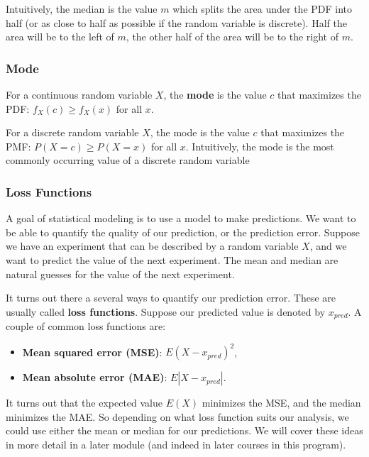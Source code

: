 \documentclass[
]{book}
\providecommand{\tightlist}{%
  \setlength{\itemsep}{0pt}\setlength{\parskip}{0pt}}
\begin{document}
Intuitively, the median is the value \(m\) which splits the area under the PDF into half (or as close to half as possible if the random variable is discrete). Half the area will be to the left of \(m\), the other half of the area will be to the right of \(m\).

\hypertarget{mode-1}{%
\subsubsection{Mode}\label{mode-1}}

For a continuous random variable \(X\), the \textbf{mode} is the value \(c\) that maximizes the PDF: \(f_X(c) \geq f_X(x)\) for all \(x\).

For a discrete random variable \(X\), the mode is the value \(c\) that maximizes the PMF: \(P(X=c) \geq P(X=x)\) for all \(x\). Intuitively, the mode is the most commonly occurring value of a discrete random variable

\hypertarget{lossfunc}{%
\subsubsection{Loss Functions}\label{lossfunc}}

A goal of statistical modeling is to use a model to make predictions. We want to be able to quantify the quality of our prediction, or the prediction error. Suppose we have an experiment that can be described by a random variable \(X\), and we want to predict the value of the next experiment. The mean and median are natural guesses for the value of the next experiment.

It turns out there a several ways to quantify our prediction error. These are usually called \textbf{loss functions}. Suppose our predicted value is denoted by \(x_{pred}\). A couple of common loss functions are:

\begin{itemize}
\tightlist
\item
  \textbf{Mean squared error (MSE)}: \(E(X-x_{pred})^2\),
\item
  \textbf{Mean absolute error (MAE)}: \(E|X-x_{pred}|\).
\end{itemize}

It turns out that the expected value \(E(X)\) minimizes the MSE, and the median minimizes the MAE. So depending on what loss function suits our analysis, we could use either the mean or median for our predictions. We will cover these ideas in more detail in a later module (and indeed in later courses in this program).
\end{document}
